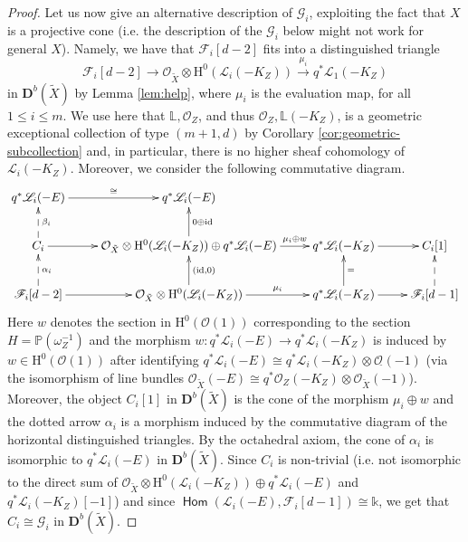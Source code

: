 \documentclass[a4paper,11pt, reqno]{amsart}
\def\L{\mathbb L}
\def\P{\mathbb P}
\def\DD{\mathbf D}
\def\OO{\mathcal O}
\def\sF{\mathscr{F}}
\def\sG{\mathscr{G}}
\def\sL{\mathscr{L}}
\def\id{{\operatorname{id}}}
\newcommand{\opname}[1]{\operatorname{\mathsf{#1}}}
\newcommand{\Hom}{\opname{Hom}}
\def\Db{\DD^b}
\theoremstyle{plain}
\theoremstyle{definition}
\numberwithin{equation}{section}
\newlength{\arrow}
\begin{document}
\begin{proof}
    Let us now give an alternative description of 
    $\sG_i$, exploiting the fact that $X$ is a projective cone (i.e. the description of the $\sG_i$ below might not work for general $X$).
Namely, we have that $\sF_{i}[d-2]$ fits into a distinguished triangle
    \[
    \sF_{i}[d-2] \to \OO_{\tilde{X}} \otimes \mathrm{H}^0 ( \sL_i (-K_Z) ) \xrightarrow{\mu_i} q^\ast \sL_1 (-K_Z) 
    \]
    in $\Db( \tilde{X} )$ by Lemma \ref{lem:help},
    where $\mu_i$ is the evaluation map, for all $1\leq i \leq m$.
    We use here that $\L , \OO_Z$, and thus $\OO_Z , \L(-K_Z)$, is a geometric exceptional collection of type $(m+1,d)$ by Corollary \ref{cor:geometric-subcollection} and, in particular, there is no higher sheaf cohomology of $\sL_i(-K_Z)$.
    Moreover, we consider the following commutative diagram.
    \begin{equation}\label{eq:octa-Gi}
\xymatrix{
    q^\ast \sL_i (-E) \ar@{<--}[d]^{\beta_i}\ar@{->}[r]^{\cong} & q^\ast \sL_i (-E) \ar@{<-}[d]^{0 \oplus \id } &   \\
    C_i  \ar@{<--}[d]^{\alpha_i}\ar@{->}[r] & \OO_{\tilde{X}} \otimes \mathrm{H}^0 ( \sL_i (-K_Z) ) \oplus q^\ast \sL_i (-E) \ar@{<-}[d]^{(\id , 0 )} \ar@{->}[r]^-{\mu_i \oplus w } &  q^\ast \sL_i (-K_Z) \ar@{<-}[d]^{=} \ar@{->}[r] & C_i [1] \ar@{<--}[d] \\
 \sF_{i}[d-2] \ar@{->}[r] &\OO_{\tilde{X}} \otimes \mathrm{H}^0 ( \sL_i (-K_Z) ) \ar@{->}[r]^-{\mu_i} &  q^\ast \sL_i (-K_Z ) \ar@{->}[r] & \sF_{i}[d-1]} 
\end{equation}
 Here $w$ denotes the section in $\mathrm{H}^0 ( \OO ( 1 ) )$ corresponding to the section $H = \P( \omega_Z^{-1} )$ and the morphism $w \colon q^\ast\sL_i (-E) \to q^\ast \sL_i (-K_Z)$ is induced by $w \in \mathrm{H}^0 ( \OO ( 1 ) )$ after identifying $q^\ast\sL_i (-E) \cong q^\ast \sL_i (-K_Z) \otimes \OO_{\tilde{}}(-1)$ (via the isomorphism of line bundles $\OO_{\tilde{X}}(-E) \cong q^\ast \OO_Z (-K_Z) \otimes \OO_{\tilde{X}}(-1)$).  
Moreover, the object $C_i[1]$ in $\Db( \tilde{X} )$ is the cone of the morphism $\mu_i \oplus w$ and the dotted arrow $\alpha_i$ is a morphism induced by the commutative diagram of the horizontal distinguished triangles.
By the octahedral axiom, the cone of $\alpha_i$ is isomorphic to $q^\ast \sL_i (-E)$ in $\Db( \tilde{X} )$.
Since $C_i$ is non-trivial (i.e. not isomorphic to the direct sum of $\OO_{\tilde{X}} \otimes \mathrm{H}^0 ( \sL_i (-K_Z) ) \oplus q^\ast \sL_i (-E)$ and $q^\ast\sL_i(-K_Z)[-1]$) and since $\Hom(\sL_i (-E) , \sF_{i}[d-1])\cong \mathbb{k}$, we get that $C_i\cong \sG_i$ in $\Db( \tilde{X} )$.

\end{proof}
\end{document}

